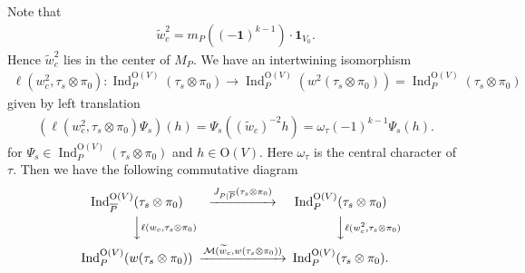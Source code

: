 \documentclass[article]{article}
\numberwithin{equation}{section}
\theoremstyle{definition}
\DeclareMathOperator{\Ind}{Ind}
\begin{document}
\begin{comment}
 It is easy to check that 
$$
\ell(w_c,\tau_s\otimes \pi_0)\circ J_{\bar{P}|P}(\tau_{s}\otimes \pi_0)= \mathcal M(\widetilde{w}_{c},\tau_{s}\otimes \pi_0)
$$


Moreover, the following diagram 
$$
\begin{tikzcd}
\Ind_{P}^{\mathrm O(V)}(\tau_{s}\otimes \pi_0) \arrow[r,"J_{\bar P|P}"] \arrow[d, "\mathrm 1"] & \Ind_{\bar P}^{\mathrm O(V)}(\tau_{s}\otimes \pi_0) \arrow[r, "J_{P|\bar P}"] \arrow[d,"\ell(w)"] &\Ind_{P}^{\mathrm O(V)}(\tau_{s}\otimes \pi_0)  \arrow[d,"\ell(w^2)"] \\
\Ind_{P}^{\mathrm O(V)}(\tau_{s}\otimes \pi_0) \arrow[r,"\mathcal M(\widetilde{w}_{c^\prime})"] & \Ind_{P}^{\mathrm O(V)}(w(\tau_{s}\otimes \pi_0)) \arrow[r]&\Ind_{P}^{\mathrm O(V)}(\tau_{s}\otimes \pi_0) 
\end{tikzcd}
$$
is commutative (rewrite this commutative diagram). 
It is easy to check that 
$$
\ell(w^2_c,\tau_s\otimes \pi_0)\circ J_{P|\bar P}(\tau_{s}\otimes \pi_0)= \mathcal M(\widetilde{w}_{c},w(\tau_{s}\otimes \pi_0))\circ \ell(w_c,\tau_s\otimes \pi_0)
$$
\end{comment}
Note that 
\begin{align*}
\widetilde{w}_{c}^2= 
m_P((-\mathbf 1)^{k-1})\cdot \mathbf 1_{V_0}.
\end{align*}
Hence $\widetilde{w}_{c}^2$ lies in the center of $M_P$. We have an intertwining isomorphism  
\begin{align*}
\ell(w^2_c,\tau_s\otimes \pi_0): \Ind_{P}^{\mathrm O(V)}(\tau_{s}\otimes \pi_0)\rightarrow \Ind_P^{\mathrm O(V)}(w^2(\tau_{s}\otimes \pi_0))=\Ind_P^{\mathrm O(V)}(\tau_{s}\otimes \pi_0)
\end{align*}
given by left translation 
\begin{align}\label{129}
\left(\ell(w_c^2,\tau_s\otimes \pi_0)\Psi_{s}\right)(h) = \Psi_s((\widetilde{w}_{c})^{-2}h)=\omega_{\tau}(-1)^{k-1}\Psi_s(h).
\end{align}
for $\Psi_s\in \Ind_{P}^{\mathrm O(V)}(\tau_{s}\otimes \pi_0)$ and $h\in \mathrm O(V)$. Here $\omega_\tau$ is the central character of $\tau$. Then we have the following commutative diagram 
\begin{equation}\label{122}
\begin{CD}
\Ind_{\overline P}^{\mathrm O(V)}(\tau_{s}\otimes \pi_0) @>J_{P|\overline P}(\tau_{s}\otimes \pi_0)>> \Ind_{P}^{\mathrm O(V)}(\tau_{s}\otimes \pi_0) \\
@VV\ell(w_c,\tau_s\otimes \pi_0)V @VV\ell(w^2_c,\tau_s\otimes \pi_0)V\\
\Ind_{P}^{\mathrm O(V)}(w(\tau_{s}\otimes \pi_0)) @>\mathcal M(\widetilde{w}_{c},w(\tau_{s}\otimes \pi_0))>> \Ind_{P}^{\mathrm O(V)}(\tau_{s}\otimes \pi_0).
\end{CD}
\end{equation}
\end{document}
